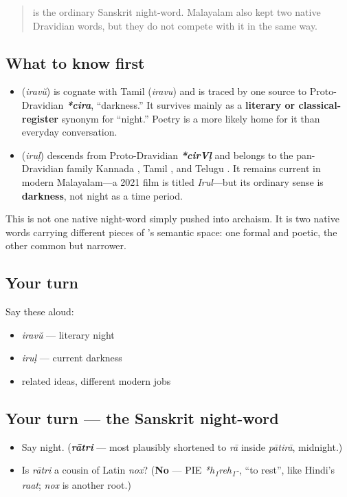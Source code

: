 \label{lesson:ML-C24-native-night-words}



\begin{quote}
\textbf{} is the ordinary Sanskrit night-word. Malayalam also kept two native Dravidian words, but they do not compete with it in the same way.
\end{quote}

\subsection*{What to know first}
\begin{itemize}
\raggedright
  \item \textbf{} (\emph{iravŭ}) is cognate with Tamil \textbf{} (\emph{iravu}) and is traced by one source to Proto-Dravidian \emph{\textbf{*cira}}, “darkness.” It survives mainly as a \textbf{literary or classical-register} synonym for “night.” Poetry is a more likely home for it than everyday conversation.
  \item \textbf{} (\emph{iruḷ}) descends from Proto-Dravidian \emph{\textbf{*cirVḷ}} and belongs to the pan-Dravidian family Kannada \textbf{}, Tamil \textbf{}, and Telugu \textbf{}. It remains current in modern Malayalam—a 2021 film is titled \emph{Irul}—but its ordinary sense is \textbf{darkness}, not night as a time period.
\end{itemize}

This is not one native night-word simply pushed into archaism. It is two native words carrying different pieces of \textbf{}’s semantic space: one formal and poetic, the other common but narrower.

\subsection*{Your turn}
Say these aloud:

\begin{itemize}
\raggedright
  \item \emph{iravŭ} — literary night
  \item \emph{iruḷ} — current darkness
  \item related ideas, different modern jobs
\end{itemize}

\subsection*{Your turn — the Sanskrit night-word}
\begin{itemize}
\raggedright
  \item Say night. (\emph{\textbf{rātri}} — most plausibly shortened to \emph{rā} inside \emph{pātirā}, midnight.)
  \item Is \emph{rātri} a cousin of Latin \emph{nox}? (\textbf{No} — PIE \emph{*h\textsubscript{1}reh\textsubscript{1}-}, \textquotedblleft{}to rest\textquotedblright{}, like Hindi's \emph{raat}; \emph{nox} is another root.)
\end{itemize}

